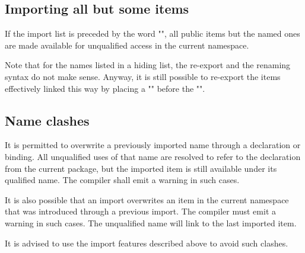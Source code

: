 
\subsection{Importing all but some items}

If the import list is preceded by the word "", all public items but the named ones are made available for unqualified access in the current namespace.


Note that for the names listed in a hiding list, the re-export and the renaming syntax do not make sense. 
Anyway, it is still possible to re-export the items effectively linked this way by placing a "" before the "".


\subsection{Name clashes}

It is permitted to overwrite a previously imported name through a declaration or binding.
All unqualified uses of that name are resolved to refer to the declaration from the current package, 
but the imported item is still available under its qualified name.
The compiler shall emit a warning in such cases.

It is also possible that an import overwrites an item in the current namespace that was introduced through a previous import.
The compiler must emit a warning in such cases.
The unqualified name will link to the last imported item.

It is advised to use the import features described above to avoid such clashes.

